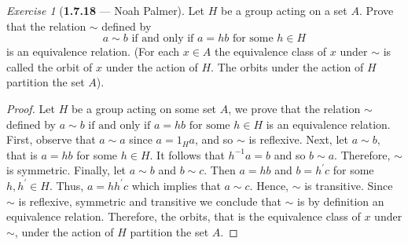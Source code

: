 \documentclass[12pt]{amsart}
\theoremstyle{remark}
\newtheorem*{exercise}{Exercise}%
\theoremstyle{mycomment}
\begin{document}
\begin{exercise}[\textbf{1.7.18} --- Noah Palmer] Let $H$ be a group acting on a set $A$. Prove that the relation $\sim$ defined by 
  $$a\sim b\text{   if and only if   } a=hb\text{   for some   }h\in H$$
  is an equivalence relation. (For each $x\in A$ the equivalence class of $x$ under $\sim$ is called the orbit of $x$ under the action of $H$. The orbits under the action of $H$ partition the set $A$).
  \begin{proof}
  Let $H$ be a group acting on some set $A$, we prove that the relation $\sim$ defined by $a\sim b\text{   if and only if   } a=hb\text{   for some   }h\in H$ is an equivalence relation. First, observe that $a\sim a$ since $a=1_Ha$, and so $\sim$ is reflexive. Next, let $a\sim b$, that is $a=hb$ for some $h\in H$. It follows that $h^{-1}a=b$ and so $b\sim a$. Therefore, $\sim$ is symmetric. Finally, let $a\sim b$ and $b\sim c$. Then $a=hb$ and $b=h^\prime c$ for some $h,h^\prime\in H$. Thus, $a=hh^\prime c$ which implies that $a\sim c$. Hence, $\sim$ is transitive. Since $\sim$ is reflexive, symmetric and transitive we conclude that $\sim$ is by definition an equivalence relation. Therefore, the orbits, that is the equivalence class of $x$ under $\sim$, under the action of $H$ partition the set $A$.
  \end{proof}
  \end{exercise}
\vspace{.15in}
\end{document}
